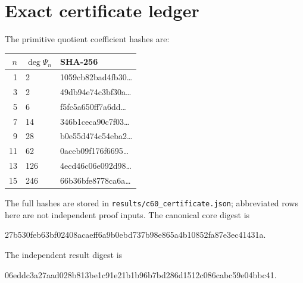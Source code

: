 \section{Exact certificate ledger}

The primitive quotient coefficient hashes are:
\begin{center}
\begin{tabular}{rll}
\toprule
$n$ & $\deg\Psi_n$ & SHA-256\\
\midrule
1 & 2 & \ttfamily 1059cb82bad4fb30\ldots\\
3 & 2 & \ttfamily 49db94e74c3bf30a\ldots\\
5 & 6 & \ttfamily f5fc5a650ff7a6dd\ldots\\
7 & 14 & \ttfamily 346b1ceca90c7f03\ldots\\
9 & 28 & \ttfamily b0e55d474c54eba2\ldots\\
11 & 62 & \ttfamily 0aceb09f176f6695\ldots\\
13 & 126 & \ttfamily 4ecd46c06e092d98\ldots\\
15 & 246 & \ttfamily 66b36bfe8778ca6a\ldots\\
\bottomrule
\end{tabular}
\end{center}
The full hashes are stored in \texttt{results/c60\_certificate.json}; abbreviated
rows here are not independent proof inputs.  The canonical core digest is
\begin{center}
\ttfamily\small
27b530feb63bf02408acaeff6a9b0ebd737b98e865a4b10852fa87e3ec41431a.
\end{center}
The independent result digest is
\begin{center}
\ttfamily\small
06eddc3a27aad028b813be1c91e21b1b96b7bd286d1512c086cabc59e04bbc41.
\end{center}
